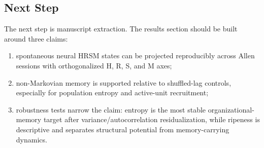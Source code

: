 \subsection{Next Step}

The next step is manuscript extraction. The results section should be built around three claims:

\begin{enumerate}
    \item spontaneous neural HRSM states can be projected reproducibly across Allen sessions with orthogonalized H, R, S, and M axes;
    \item non-Markovian memory is supported relative to shuffled-lag controls, especially for population entropy and active-unit recruitment;
    \item robustness tests narrow the claim: entropy is the most stable organizational-memory target after variance/autocorrelation residualization, while ripeness is descriptive and separates structural potential from memory-carrying dynamics.
\end{enumerate}
